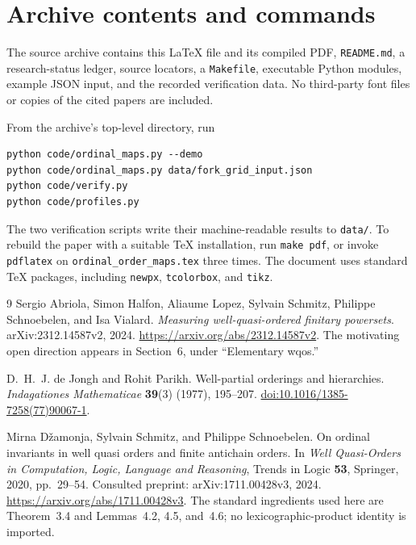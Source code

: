 \documentclass[11pt,a4paper]{article}
\theoremstyle{definition}
\theoremstyle{remark}
\begin{document}
\section{Archive contents and commands}
The source archive contains this \LaTeX{} file and its compiled PDF,
\texttt{README.md}, a research-status ledger, source locators, a
\texttt{Makefile}, executable Python modules, example JSON input, and the
recorded verification data. No third-party font files or copies of the
cited papers are included.

From the archive's top-level directory, run
\begin{lstlisting}
python code/ordinal_maps.py --demo
python code/ordinal_maps.py data/fork_grid_input.json
python code/verify.py
python code/profiles.py
\end{lstlisting}
The two verification scripts write their machine-readable results to
\texttt{data/}. To rebuild the paper with a suitable TeX installation,
run \texttt{make pdf}, or invoke \texttt{pdflatex} on
\texttt{ordinal\_order\_maps.tex} three times. The document uses standard
TeX packages, including \texttt{newpx}, \texttt{tcolorbox}, and
\texttt{tikz}.

\begin{thebibliography}{9}
Sergio Abriola, Simon Halfon, Aliaume Lopez, Sylvain Schmitz,
Philippe Schnoebelen, and Isa Vialard.
\emph{Measuring well-quasi-ordered finitary powersets}.
arXiv:2312.14587v2, 2024.
\url{https://arxiv.org/abs/2312.14587v2}.
The motivating open direction appears in Section~6, under
``Elementary wqos.''

D.~H.~J. de Jongh and Rohit Parikh.
Well-partial orderings and hierarchies.
\emph{Indagationes Mathematicae} \textbf{39}(3) (1977), 195--207.
\href{https://doi.org/10.1016/1385-7258(77)90067-1}
{doi:10.1016/1385-7258(77)90067-1}.

Mirna D\v{z}amonja, Sylvain Schmitz, and Philippe Schnoebelen.
On ordinal invariants in well quasi orders and finite antichain orders.
In \emph{Well Quasi-Orders in Computation, Logic, Language and Reasoning},
Trends in Logic \textbf{53}, Springer, 2020, pp.~29--54.
Consulted preprint: arXiv:1711.00428v3, 2024.
\url{https://arxiv.org/abs/1711.00428v3}.
The standard ingredients used here are Theorem~3.4 and Lemmas~4.2,
4.5, and~4.6; no lexicographic-product identity is imported.
\end{thebibliography}
\end{document}
